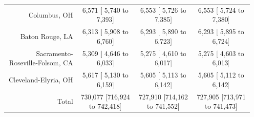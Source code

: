 \documentclass{article}
\begin{document}
\begin{table}[H]
\begin{tabular}{|r|c|c|c|}
		Columbus, OH &   6,571 [  5,740 to   7,393] &   6,553 [  5,726 to   7,385] &   6,553 [  5,724 to   7,380]\\
		Baton Rouge, LA &   6,313 [  5,908 to   6,760] &   6,293 [  5,890 to   6,723] &   6,293 [  5,895 to   6,724]\\
		Sacramento-Roseville-Folsom, CA &   5,309 [  4,646 to   6,033] &   5,275 [  4,610 to   6,017] &   5,275 [  4,603 to   6,013]\\
		Cleveland-Elyria, OH &   5,617 [  5,130 to   6,159] &   5,605 [  5,113 to   6,142] &   5,605 [  5,112 to   6,142]\\
		\hline
		Total & 730,077 [716,924 to 742,418] & 727,910 [714,162 to 741,552] & 727,905 [713,971 to 741,473]\\
		\hline
	\end{tabular}
\end{table}
\end{document}
